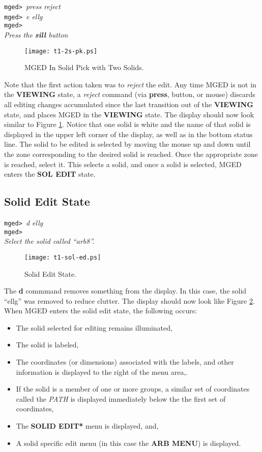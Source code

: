 \noindent
{\tt mged> }{\em press reject}\\
{\tt mged> }{\em e ellg}\\
{\tt mged> }\\
{\em Press the {\bf sill} button}\\

\begin{figure}
\centering \texttt{[image: t1-2s-pk.ps]}
\caption{MGED In Solid Pick with Two Solids.}
\label{t1-2s-pk}
\end{figure}

Note that the first action taken was to {\sl reject} the edit.  Any time MGED
is not in the {\bf VIEWING} state, a {\sl reject} command (via
{\bf press}, button, or mouse) discards all editing changes accumulated
since the last transition out of the {\bf VIEWING} state, and places
MGED in the {\bf VIEWING} state.
The display should now look similar to Figure \ref{t1-2s-pk}.
Notice that one solid is white and
the name of that solid is displayed in the upper left corner of the
display, as well as in the bottom status line. The solid to be edited is
selected by moving the mouse up and down until the zone corresponding to
the desired solid is reached. Once the appropriate zone is reached, select it.
This selects a solid, and once a solid is selected,
MGED enters the {\bf SOL EDIT} state.

\subsection{Solid Edit State}

\noindent
{\tt mged> }{\em d ellg}\\
{\tt mged> }\\
{\em Select the solid called ``arb8''.}\\

\begin{figure}
\centering \texttt{[image: t1-sol-ed.ps]}
\caption{Solid Edit State.}
\label{t1-sol-ed}
\end{figure}

The {\bf d} commmand removes something from the display.  In this
case, the solid ``ellg'' was removed to reduce clutter.
The display should now look like Figure \ref{t1-sol-ed}.
When MGED enters the solid edit state, the following occurs:
\begin{itemize}
\item The solid selected for editing remains illuminated,
\item The solid is labeled,
\item The coordinates (or dimensions) associated with the labels,
and other information is displayed to the right of the menu area,.
\item If the solid is a member of one or more groups, a similar set
of coordinates called the {\sl PATH} is displayed immediately below
the the first set of coordinates,
\item The {\bf *SOLID EDIT*} menu is displayed, and,
\item A solid specific edit menu (in this case the {\bf ARB MENU})
is displayed.
\end{itemize}

